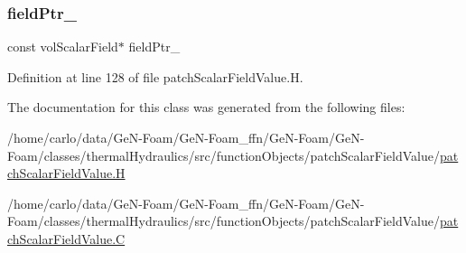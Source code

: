 \subsubsection{\texorpdfstring{field\+Ptr\+\_\+}{fieldPtr\_}}
{\footnotesize\ttfamily const vol\+Scalar\+Field$\ast$ field\+Ptr\+\_\+\hspace{0.3cm}{\ttfamily [protected]}}



Definition at line 128 of file patch\+Scalar\+Field\+Value.\+H.



The documentation for this class was generated from the following files\+:\begin{DoxyCompactItemize}
\item 
/home/carlo/data/\+Ge\+N-\/\+Foam/\+Ge\+N-\/\+Foam\+\_\+ffn/\+Ge\+N-\/\+Foam/\+Ge\+N-\/\+Foam/classes/thermal\+Hydraulics/src/function\+Objects/patch\+Scalar\+Field\+Value/\hyperlink{patchScalarFieldValue_8H}{patch\+Scalar\+Field\+Value.\+H}\item 
/home/carlo/data/\+Ge\+N-\/\+Foam/\+Ge\+N-\/\+Foam\+\_\+ffn/\+Ge\+N-\/\+Foam/\+Ge\+N-\/\+Foam/classes/thermal\+Hydraulics/src/function\+Objects/patch\+Scalar\+Field\+Value/\hyperlink{patchScalarFieldValue_8C}{patch\+Scalar\+Field\+Value.\+C}\end{DoxyCompactItemize}
